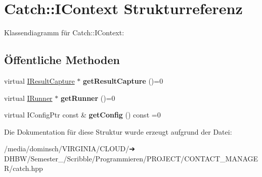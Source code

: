 \hypertarget{structCatch_1_1IContext}{}\section{Catch\+:\+:I\+Context Strukturreferenz}
\label{structCatch_1_1IContext}


Klassendiagramm für Catch\+:\+:I\+Context\+:
\subsection*{Öffentliche Methoden}
\begin{DoxyCompactItemize}
\item 
\mbox{\label{structCatch_1_1IContext_a684e4ae71d1fdf3060c352ecde1d122f}} 
virtual \hyperlink{structCatch_1_1IResultCapture}{I\+Result\+Capture} $\ast$ {\bfseries get\+Result\+Capture} ()=0
\item 
\mbox{\label{structCatch_1_1IContext_af088415dde18d039ed5a2f95b02767c6}} 
virtual \hyperlink{structCatch_1_1IRunner}{I\+Runner} $\ast$ {\bfseries get\+Runner} ()=0
\item 
\mbox{\label{structCatch_1_1IContext_a72a2718232adea8925fec9e71d3efd75}} 
virtual I\+Config\+Ptr const  \& {\bfseries get\+Config} () const =0
\end{DoxyCompactItemize}


Die Dokumentation für diese Struktur wurde erzeugt aufgrund der Datei\+:\begin{DoxyCompactItemize}
\item 
/media/dominsch/\+V\+I\+R\+G\+I\+N\+I\+A/\+C\+L\+O\+U\+D/➔ D\+H\+B\+W/\+Semester\+\_/\+Scribble/\+Programmieren/\+P\+R\+O\+J\+E\+C\+T/\+C\+O\+N\+T\+A\+C\+T\+\_\+\+M\+A\+N\+A\+G\+E\+R/catch.\+hpp\end{DoxyCompactItemize}
